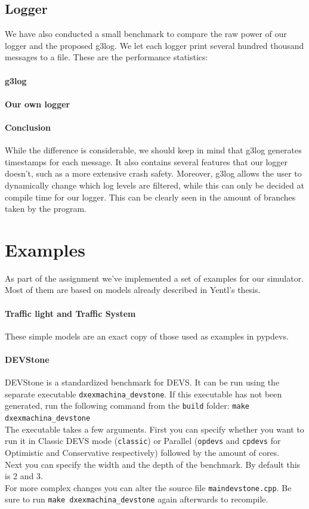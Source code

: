 \documentclass[8pt,a4paper]{report}
\begin{document}
\section{Logger}
We have also conducted a small benchmark to compare the raw power of our logger and the proposed g3log.
We let each logger print several hundred thousand messages to a file. These are the performance statistics:
\subsubsection{g3log}

\subsubsection{Our own logger}

\subsubsection{Conclusion}
While the difference is considerable, we should keep in mind that g3log generates timestamps for each message. It also contains several features that our logger doesn't, such as a more extensive crash safety. Moreover, g3log allows the user to dynamically change which log levels are filtered, while this can only be decided at compile time for our logger. This can be clearly seen in the amount of branches taken by the program.

\chapter{Examples}
As part of the assignment we've implemented a set of examples for our simulator. Most of them are based on models already described in Yentl's thesis. 

\subsubsection{Traffic light and Traffic System}
These simple models are an exact copy of those used as examples in pypdevs.

\subsubsection{DEVStone}
DEVStone is a standardized benchmark for DEVS. It can be run using the separate executable \texttt{dxexmachina\_devstone}. If this executable has not been generated, run the following command from the \texttt{build} folder: \texttt{make dxexmachina\_devstone}\\
The executable takes a few arguments. First you can specify whether you want to run it in Classic DEVS mode (\texttt{classic}) or Parallel (\texttt{opdevs} and \texttt{cpdevs} for Optimistic and Conservative respectively) followed by the amount of cores.\\
Next you can specify the width and the depth of the benchmark. By default this is 2 and 3.\\
For more complex changes you can alter the source file \texttt{maindevstone.cpp}. Be sure to run \texttt{make dxexmachina\_devstone} again afterwards to recompile.
\end{document}
